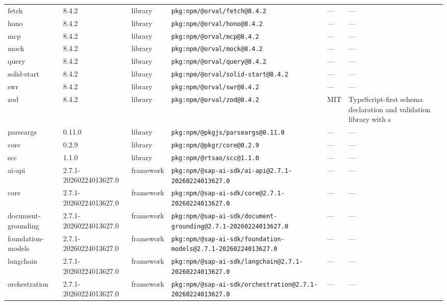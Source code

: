 \documentclass[11pt,a4paper]{article}
\begin{document}
\begin{longtable}{|p{4cm}|p{2cm}|p{1.6cm}|p{5cm}|p{1.5cm}|p{3.5cm}|}
\raggedright fetch & 8.4.2 & library & \small\texttt{pkg:npm/@orval/fetch@8.4.2} & — & \small — \\
\raggedright hono & 8.4.2 & library & \small\texttt{pkg:npm/@orval/hono@8.4.2} & — & \small — \\
\raggedright mcp & 8.4.2 & library & \small\texttt{pkg:npm/@orval/mcp@8.4.2} & — & \small — \\
\raggedright mock & 8.4.2 & library & \small\texttt{pkg:npm/@orval/mock@8.4.2} & — & \small — \\
\raggedright query & 8.4.2 & library & \small\texttt{pkg:npm/@orval/query@8.4.2} & — & \small — \\
\raggedright solid-start & 8.4.2 & library & \small\texttt{pkg:npm/@orval/solid-start@8.4.2} & — & \small — \\
\raggedright swr & 8.4.2 & library & \small\texttt{pkg:npm/@orval/swr@8.4.2} & — & \small — \\
\raggedright zod & 8.4.2 & library & \small\texttt{pkg:npm/@orval/zod@8.4.2} & MIT & \small TypeScript-first schema declaration and validation library with s \\
\raggedright parseargs & 0.11.0 & library & \small\texttt{pkg:npm/@pkgjs/parseargs@0.11.0} & — & \small — \\
\raggedright core & 0.2.9 & library & \small\texttt{pkg:npm/@pkgr/core@0.2.9} & — & \small — \\
\raggedright scc & 1.1.0 & library & \small\texttt{pkg:npm/@rtsao/scc@1.1.0} & — & \small — \\
\raggedright ai-api & 2.7.1-20260224013627.0 & framework & \small\texttt{pkg:npm/@sap-ai-sdk/ai-api@2.7.1-20260224013627.0} & — & \small — \\
\raggedright core & 2.7.1-20260224013627.0 & framework & \small\texttt{pkg:npm/@sap-ai-sdk/core@2.7.1-20260224013627.0} & — & \small — \\
\raggedright document-grounding & 2.7.1-20260224013627.0 & framework & \small\texttt{pkg:npm/@sap-ai-sdk/document-grounding@2.7.1-20260224013627.0} & — & \small — \\
\raggedright foundation-models & 2.7.1-20260224013627.0 & framework & \small\texttt{pkg:npm/@sap-ai-sdk/foundation-models@2.7.1-20260224013627.0} & — & \small — \\
\raggedright langchain & 2.7.1-20260224013627.0 & framework & \small\texttt{pkg:npm/@sap-ai-sdk/langchain@2.7.1-20260224013627.0} & — & \small — \\
\raggedright orchestration & 2.7.1-20260224013627.0 & framework & \small\texttt{pkg:npm/@sap-ai-sdk/orchestration@2.7.1-20260224013627.0} & — & \small — \\

\end{longtable}
\end{document}
